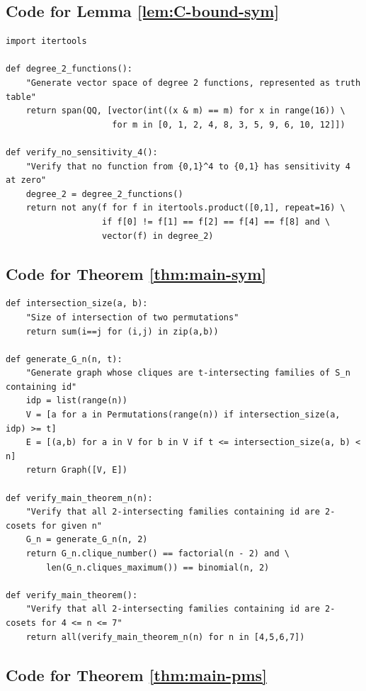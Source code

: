 \documentclass[10pt,a4paper]{amsart}
\theoremstyle{definition}
\begin{document}
\subsection{Code for Lemma \ref{lem:C-bound-sym}} \label{apx:C-bound-sym}

\begin{lstlisting}
import itertools

def degree_2_functions():
    "Generate vector space of degree 2 functions, represented as truth table"
    return span(QQ, [vector(int((x & m) == m) for x in range(16)) \
                     for m in [0, 1, 2, 4, 8, 3, 5, 9, 6, 10, 12]])

def verify_no_sensitivity_4():
    "Verify that no function from {0,1}^4 to {0,1} has sensitivity 4 at zero"
    degree_2 = degree_2_functions()
    return not any(f for f in itertools.product([0,1], repeat=16) \
                   if f[0] != f[1] == f[2] == f[4] == f[8] and \
                   vector(f) in degree_2)
\end{lstlisting}

\subsection{Code for Theorem \ref{thm:main-sym}} \label{apx:main-sym}

\begin{lstlisting}
def intersection_size(a, b):
    "Size of intersection of two permutations"
    return sum(i==j for (i,j) in zip(a,b))

def generate_G_n(n, t):
    "Generate graph whose cliques are t-intersecting families of S_n containing id"
    idp = list(range(n))
    V = [a for a in Permutations(range(n)) if intersection_size(a, idp) >= t]
    E = [(a,b) for a in V for b in V if t <= intersection_size(a, b) < n]
    return Graph([V, E])

def verify_main_theorem_n(n):
    "Verify that all 2-intersecting families containing id are 2-cosets for given n"
    G_n = generate_G_n(n, 2)
    return G_n.clique_number() == factorial(n - 2) and \
        len(G_n.cliques_maximum()) == binomial(n, 2)

def verify_main_theorem():
    "Verify that all 2-intersecting families containing id are 2-cosets for 4 <= n <= 7"
    return all(verify_main_theorem_n(n) for n in [4,5,6,7])
\end{lstlisting}

\subsection{Code for Theorem \ref{thm:main-pms}} \label{apx:main-pms}
\end{document}
